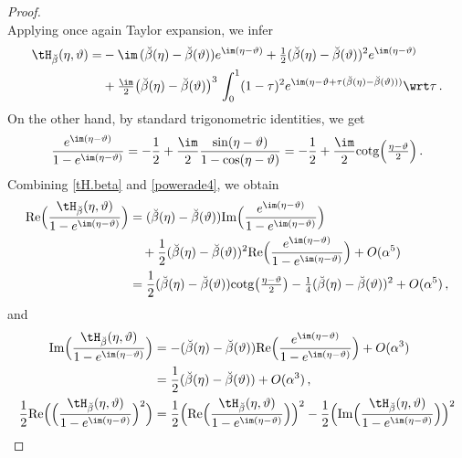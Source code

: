 \documentclass[a4paper,reqno,10pt]{article}
\begin{document}
\begin{proof}
\begin{equation}
\end{equation}
Applying once again  Taylor expansion, we infer
\begin{equation}\label{tH.beta}
	\begin{aligned}
		\tH_{\breve{\beta}} (\eta,\vartheta)  		=&  - \im\,(\breve{\beta}(\eta)-\breve{\beta}(\vartheta)) e^{\im(\eta-\vartheta)} + \tfrac12 (\breve{\beta}(\eta)-\breve{\beta}(\vartheta))^2 e^{\im(\eta-\vartheta)}  \\
		& + \tfrac{\im}{2} \big( \breve{\beta}(\eta)-\breve{\beta}(\vartheta) \big)^3\, \int_{0}^{1} (1-\tau)^2 e^{\im ( \eta-\vartheta  + \tau ( \breve{\beta}(\eta)-\breve{\beta}(\vartheta) ) )} \wrt \tau  \,.
	\end{aligned}
\end{equation}
On the other hand,  by standard  trigonometric identities, we get
\begin{equation}\label{powerade4}
	\frac{e^{\im(\eta-\vartheta)}}{1-e^{\im(\eta-\vartheta)}} = -\frac12 +\frac{\im}{2} \frac{\sin(\eta-\vartheta)}{1-\cos(\eta-\vartheta)} = -\frac12 +\frac{\im}{2} {\rm cotg} \Big( \tfrac{\eta-\vartheta}{2}\Big) \,.
\end{equation}
Combining   \eqref{tH.beta} and \eqref{powerade4}, we obtain
	\begin{align*}
		{\rm Re} \Big( \frac{\tH_{\breve{\beta}}(\eta,\vartheta)}{1-e^{\im(\eta-\vartheta)}}  \Big)  &= (\breve{\beta}(\eta)-\breve{\beta}(\vartheta)) {\rm Im} \Big( \frac{e^{\im(\eta-\vartheta)}} {1-e^{\im(\eta-\vartheta)}}  \Big)  \\
		& \quad + \frac12 (\breve{\beta}(\eta)-\breve{\beta}(\vartheta))^2 {\rm Re} \Big( \frac{e^{\im(\eta-\vartheta)}}{1-e^{\im(\eta-\vartheta)}}  \Big)  + O(\alpha^5)  \\
		& =\frac12 (\breve{\beta}(\eta)-\breve{\beta}(\vartheta)) {\rm cotg} \big( \tfrac{\eta-\vartheta}{2} \big) - \tfrac14  (\breve{\beta}(\eta)-\breve{\beta}(\vartheta))^2 + O(\alpha^5) \,,	\end{align*}
	and 
	\begin{align}
				{\rm Im} \Big( \frac{\tH_{\breve{\beta}}(\eta,\vartheta)}{1-e^{\im(\eta-\vartheta)}}  \Big)  &= - (\breve{\beta}(\eta)-\breve{\beta}(\vartheta)) {\rm Re} \Big( \frac{e^{\im(\eta-\vartheta)}} {1-e^{\im(\eta-\vartheta)}}  \Big) + O(\alpha^3)  \\ 
		& = \frac12 (\breve{\beta}(\eta)-\breve{\beta}(\vartheta)) + O(\alpha^3) \,, \\
		\frac12 {\rm Re} \Big( \Big( \frac{\tH_{\breve{\beta}}(\eta,\vartheta)}{1-e^{\im(\eta-\vartheta)}} \Big)^2  \Big) & =\frac12 \Big(   {\rm Re} \Big( \frac{\tH_{\breve{\beta}}(\eta,\vartheta)}{1-e^{\im(\eta-\vartheta)}} \Big)  \Big)^2 - \frac12 \Big(  {\rm Im} \Big( \frac{\tH_{\breve{\beta}}(\eta,\vartheta)}{1-e^{\im(\eta-\vartheta)}} \Big)  \Big)^2 \\

\end{align}
\end{proof}
\end{document}
